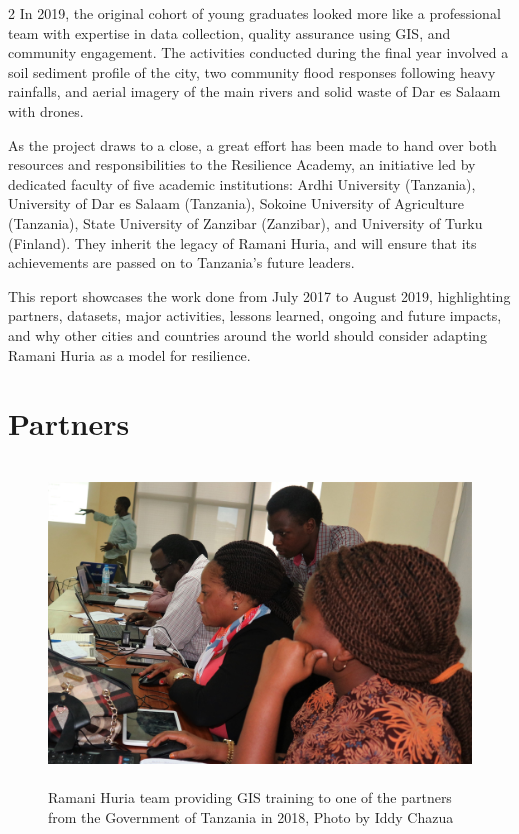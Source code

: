 \documentclass[a4paper,12pt,twoside]{article}
\begin{document}
\begin{multicols} {2}
In 2019, the original cohort of young graduates looked more like a professional team with expertise in data collection, quality assurance using GIS, and community engagement. The activities conducted during the final year involved a soil sediment profile of the city, two community flood responses following heavy rainfalls, and aerial imagery of the main rivers and solid waste of Dar es Salaam with drones. 

As the project draws to a close, a great effort has been made to hand over both resources and responsibilities to the Resilience Academy, an initiative led by dedicated faculty of five academic institutions: Ardhi University (Tanzania), University of Dar es Salaam (Tanzania), Sokoine University of Agriculture (Tanzania), State University of Zanzibar (Zanzibar), and University of Turku (Finland). They inherit the legacy of Ramani Huria, and will ensure that its achievements are passed on to Tanzania’s future leaders. 

This report showcases the work done from July 2017 to August 2019, highlighting partners, datasets, major activities, lessons learned, ongoing and future impacts, and why other cities and countries around the world should consider adapting Ramani Huria as a model for resilience.

\end{multicols}

\newpage
\section{Partners}
\begin{figure}[h!]
	\centering
	\includegraphics[width=\textwidth, height=8.5cm,keepaspectratio]{images/NBS_training_2.JPG}
	\caption{Ramani Huria team providing GIS training to one of the partners from the Government of Tanzania in 2018, Photo by Iddy Chazua}
\end{figure}
\end{document}
